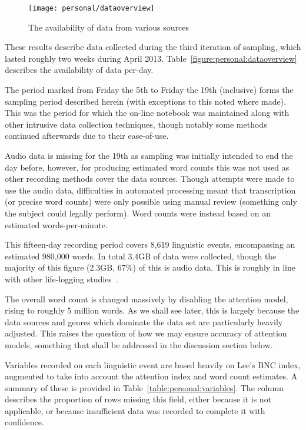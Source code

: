 

\begin{figure}[hp]
    \centering
    \begin{sideways}
        \texttt{[image: personal/dataoverview]}
    \end{sideways}
    \caption{The availability of data from various sources}
    \label{fig:personal:dataoverview}
\end{figure}


These results describe data collected during the third iteration of sampling, which lasted roughly two weeks during April 2013.  Table~\ref{figure:personal:dataoverview} describes the availability of data per-day.

The period marked from Friday the 5th to Friday the 19th (inclusive) forms the sampling period described herein (with exceptions to this noted where made).  This was the period for which the on-line notebook was maintained along with other intrusive data collection techniques, though notably some methods continued afterwards due to their ease-of-use.

Audio data is missing for the 19th as sampling was initially intended to end the day before, however, for producing estimated word counts this was not used as other recording methods cover the data sources.  Though attempts were made to use the audio data, difficulties in automated processing meant that transcription (or precise word counts) were only possible using manual review (something only the subject could legally perform).  Word counts were instead based on an estimated words-per-minute.


This fifteen-day recording period covers 8,619 linguistic events, encompassing an estimated 980,000 words.  In total 3.4GB of data were collected, though the majority of this figure (2.3GB, 67\%) of this is audio data.  This is roughly in line with other life-logging studies~\cite{gemmell2006mylifebits}.

The overall word count is changed massively by disabling the attention model, rising to roughly 5 million words.  As we shall see later, this is largely because the data sources and genres which dominate the data set are particularly heavily adjusted.  This raises the question of how we may ensure accuracy of attention models, something that shall be addressed in the discussion section below.




Variables recorded on each linguistic event are based heavily on Lee's BNC index, augmented to take into account the attention index and word count estimates.  A summary of these is provided in Table~\ref{table:personal:variables}.  The  column describes the proportion of rows missing this field, either because it is not applicable, or because insufficient data was recorded to complete it with confidence.

